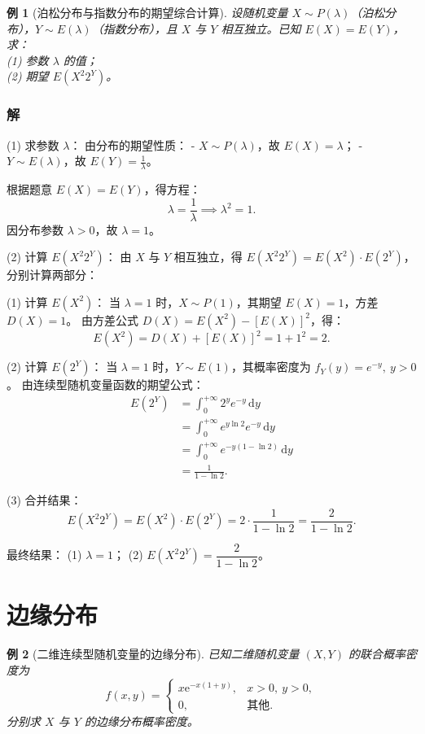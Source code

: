 \documentclass{book}
\newtheorem{example}{例}[subsection]
\begin{document}
\begin{example}[泊松分布与指数分布的期望综合计算]
设随机变量 $X \sim P(\lambda)$（泊松分布），$Y \sim E(\lambda)$（指数分布），且 $X$ 与 $Y$ 相互独立。已知 $E(X) = E(Y)$，求：\\
(1) 参数 $\lambda$ 的值；\\
(2) 期望 $E(X^2 2^Y)$。
\end{example}

\subsubsection{解}
(1) 求参数 $\lambda$：
由分布的期望性质：
- $X \sim P(\lambda)$，故 $E(X) = \lambda$；
- $Y \sim E(\lambda)$，故 $E(Y) = \frac{1}{\lambda}$。

根据题意 $E(X) = E(Y)$，得方程：
\[
\lambda = \frac{1}{\lambda} \implies \lambda^2 = 1.
\]
因分布参数 $\lambda > 0$，故 $\lambda = 1$。

(2) 计算 $E(X^2 2^Y)$：
由 $X$ 与 $Y$ 相互独立，得 $E(X^2 2^Y) = E(X^2) \cdot E(2^Y)$，分别计算两部分：

(1) 计算 $E(X^2)$：
当 $\lambda = 1$ 时，$X \sim P(1)$，其期望 $E(X) = 1$，方差 $D(X) = 1$。
由方差公式 $D(X) = E(X^2) - [E(X)]^2$，得：
\[
E(X^2) = D(X) + [E(X)]^2 = 1 + 1^2 = 2.
\]

(2) 计算 $E(2^Y)$：
当 $\lambda = 1$ 时，$Y \sim E(1)$，其概率密度为 $f_Y(y) = e^{-y},\ y > 0$。
由连续型随机变量函数的期望公式：
\[
\begin{aligned}
E(2^Y) &= \int_{0}^{+\infty} 2^y e^{-y} \,\mathrm{d}y \\
&= \int_{0}^{+\infty} e^{y \ln 2} e^{-y} \,\mathrm{d}y \\
&= \int_{0}^{+\infty} e^{-y(1 - \ln 2)} \,\mathrm{d}y \\
&= \frac{1}{1 - \ln 2}.
\end{aligned}
\]

(3) 合并结果：
\[
E(X^2 2^Y) = E(X^2) \cdot E(2^Y) = 2 \cdot \frac{1}{1 - \ln 2} = \frac{2}{1 - \ln 2}.
\]

最终结果：
(1) $\boxed{\lambda = 1}$；
(2) $\boxed{E(X^2 2^Y) = \dfrac{2}{1 - \ln 2}}$。

\section{边缘分布}

\begin{example}[二维连续型随机变量的边缘分布]
已知二维随机变量 $(X,Y)$ 的联合概率密度为
\[
f(x,y) = 
\begin{cases}
x \mathrm{e}^{-x(1+y)}, & x>0,\ y>0, \\
0, & \text{其他}.
\end{cases}
\]
分别求 $X$ 与 $Y$ 的边缘分布概率密度。
\end{example}
\end{document}
